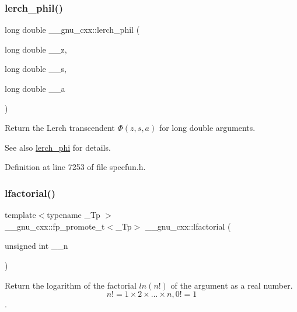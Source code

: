 \subsubsection{\texorpdfstring{lerch\+\_\+phil()}{lerch\_phil()}}
{\footnotesize\ttfamily long double \+\_\+\+\_\+gnu\+\_\+cxx\+::lerch\+\_\+phil (\begin{DoxyParamCaption}\item[{long double}]{\+\_\+\+\_\+z,  }\item[{long double}]{\+\_\+\+\_\+s,  }\item[{long double}]{\+\_\+\+\_\+a }\end{DoxyParamCaption})\hspace{0.3cm}{\ttfamily [inline]}}

Return the Lerch transcendent $ \Phi(z,s,a) $ for {\ttfamily  long double } arguments.

\begin{DoxySeeAlso}{See also}
\hyperlink{group__gnu__math__spec__func_ga31d7cfc601a99d72e58f654d0c890fd6}{lerch\+\_\+phi} for details. 
\end{DoxySeeAlso}


Definition at line 7253 of file specfun.\+h.

\mbox{\label{group__gnu__math__spec__func_gab256f8d7b77b9a8fefafca21827166eb}} 
\subsubsection{\texorpdfstring{lfactorial()}{lfactorial()}}
{\footnotesize\ttfamily template$<$typename \+\_\+\+Tp $>$ \\
\+\_\+\+\_\+gnu\+\_\+cxx\+::fp\+\_\+promote\+\_\+t$<$\+\_\+\+Tp$>$ \+\_\+\+\_\+gnu\+\_\+cxx\+::lfactorial (\begin{DoxyParamCaption}\item[{unsigned int}]{\+\_\+\+\_\+n }\end{DoxyParamCaption})\hspace{0.3cm}{\ttfamily [inline]}}



Return the logarithm of the factorial $ ln(n!) $ of the argument as a real number. \[ n! = 1 \times 2 \times ... \times n, 0! = 1 \]. 



